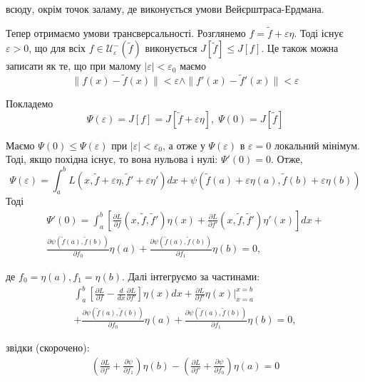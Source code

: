 \documentclass[14pt]{extarticle}
\newcommand{\<}{\langle}
\renewcommand{\>}{\rangle}
\theoremstyle{mystyle}{\newtheorem{definition}{Definition}[section]}
\theoremstyle{mystyle}{\newtheorem{proposition}[definition]{Proposition}}
\theoremstyle{mystyle}{\newtheorem{theorem}[definition]{Theorem}}
\theoremstyle{mystyle}{\newtheorem{lemma}[definition]{Lemma}}
\theoremstyle{mystyle}{\newtheorem{corollary}[definition]{Corollary}}
\theoremstyle{mystyle}{\newtheorem*{remark}{Remark}}
\theoremstyle{mystyle}{\newtheorem*{remarks}{Remarks}}
\theoremstyle{mystyle}{\newtheorem*{example}{Example}}
\theoremstyle{mystyle}{\newtheorem*{examples}{Examples}}
\theoremstyle{definition}{\newtheorem*{exercise}{Exercise}}
\theoremstyle{cstyle}{\newtheorem*{cthm}{}}
\theoremstyle{warn}
\begin{document}
всюду, окрім точок заламу, де виконується умови Вейєрштраса-Ердмана. 

Тепер отримаємо умови трансверсальності. Розглянемо $f = \widetilde{f}+\varepsilon \eta$.
Тоді існує $\varepsilon>0$, що для всіх $f \in \mathcal{U}_{\varepsilon}^{-}(\widetilde{f})$ виконується 
$J[\widetilde{f}] \leq J[f]$. Це також можна записати як те, що при малому $|\varepsilon| < \varepsilon_0$ маємо
\begin{equation}
    \|f(x) - \widetilde{f}(x)\| < \varepsilon \wedge \|f'(x)-\widetilde{f}'(x)\| < \varepsilon
\end{equation}

Покладемо
\begin{equation}
    \Psi(\varepsilon) = J[f] = J[\widetilde{f} + \varepsilon\eta], \; \Psi(0) = J[\widetilde{f}]
\end{equation}

Маємо $\Psi(0) \leq \Psi(\varepsilon)$ при $|\varepsilon|<\varepsilon_0$, а отже у $\Psi(\varepsilon)$ в $\varepsilon=0$ локальний мінімум. Тоді,
якщо похідна існує, то вона нульова і нулі: $\Psi'(0)=0$. Отже,
\begin{equation}
    \Psi(\varepsilon) = \int_a^b L(x,\widetilde{f}+\varepsilon\eta,\widetilde{f}'+\varepsilon\eta')dx + \psi(\widetilde{f}(a)+\varepsilon\eta(a),\widetilde{f}(b)+\varepsilon\eta(b))
\end{equation}
Тоді
\begin{gather}
    \Psi'(0) = \int_a^b \left[\frac{\partial L}{\partial f}(x,\widetilde{f},\widetilde{f}')\eta(x) + \frac{\partial L}{\partial f'}(x,\widetilde{f},\widetilde{f}')\eta'(x)\right]dx + \\\frac{\partial \psi(\widetilde{f}(a),\widetilde{f}(b))}{\partial f_0}\eta(a) + \frac{\partial \psi(\widetilde{f}(a),\widetilde{f}(b))}{\partial f_1}\eta(b) = 0,
\end{gather}

де $f_0=\eta(a),f_1=\eta(b)$. Далі інтегруємо за частинами:
\begin{gather}
    \int_a^b \left[\frac{\partial L}{\partial f} - \frac{d}{dx}\frac{\partial L}{\partial f'}\right]\eta(x)dx + \frac{\partial L}{\partial f'}\eta(x)\Big|_{x=a}^{x=b} \\
    + \frac{\partial \psi(\widetilde{f}(a),\widetilde{f}(b))}{\partial f_0}\eta(a) + \frac{\partial \psi(\widetilde{f}(a),\widetilde{f}(b))}{\partial f_1}\eta(b) = 0,
\end{gather}

звідки (скорочено):
\begin{gather}
    \left(\frac{\partial L}{\partial f'}+\frac{\partial\psi}{\partial f_1}\right)\eta(b) - \left(\frac{\partial L}{\partial f'}+\frac{\partial\psi}{\partial f_0}\right)\eta(a) = 0
\end{gather}
\end{document}
